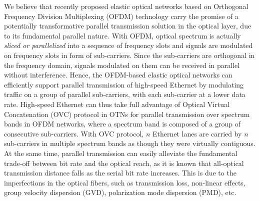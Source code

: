 \documentclass[conference]{IEEEtran}
\begin{document}
\par We believe that recently proposed elastic optical networks based on Orthogonal Frequency Division Multiplexing (OFDM)  technology carry the promise of a potentially transformative parallel transmission solution in the optical layer, due to its fundamental parallel nature.   With OFDM, optical spectrum is  actually \emph{sliced or parallelized}  into a sequence of frequency slots and  signals are modulated on frequency slots in form of sub-carriers. Since the sub-carriers are orthogonal in the frequency domain, signals modulated on them can be received in parallel without interference. Hence, the OFDM-based elastic optical networks can efficiently support  parallel transmission of high-speed Ethernet by modulating  traffic on a group of parallel sub-carriers,  with each sub-carrier at a lower data rate.  High-speed Ethernet can thus take full advantage of Optical Virtual Concatenation (OVC) protocol in OTNs for parallel transmission over  spectrum bands in OFDM networks, where a spectrum band is composed of a group of consecutive sub-carriers. With OVC protocol,  $n$ Ethernet lanes are  carried by $n$ sub-carriers in multiple spectrum bands as though they were virtually contiguous. At the same time,  parallel transmission can easily alleviate the fundamental trade-off between bit rate and the optical reach, as it is known that all-optical transmission distance falls as the serial bit rate increases. This is due to the imperfections in the optical fibers, such as transmission loss, non-linear effects, group velocity dispersion (GVD), polarization mode dispersion (PMD), etc.    
\end{document}

